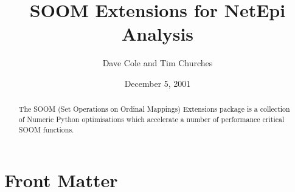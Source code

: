 \documentclass[a4paper]{howto}
\title{SOOM Extensions for NetEpi Analysis}
\author{Dave Cole and Tim Churches}
\date{December 5, 2001}
\begin{document}
\maketitle

\ifhtml
\chapter*{Front Matter\label{front}}
\fi



\begin{abstract}

\noindent

The SOOM (Set Operations on Ordinal Mappings) Extensions package is a collection
of Numeric Python optimisations which accelerate a number of performance
critical SOOM functions.

\begin{seealso}
\end{seealso}

\end{abstract}

\tableofcontents








\end{document}
